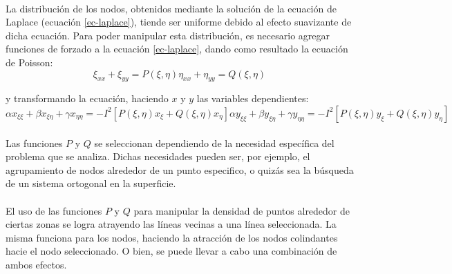 \documentclass[letterpaper, openright, 12pt]{book}
\begin{document}
    \paragraph*{}
        La distribución de los nodos, obtenidos mediante la solución de la
        ecuación de Laplace (ecuación \ref{ec-laplace}), tiende ser uniforme
        debido al efecto suavizante de dicha ecuación. Para poder manipular esta
        distribución, es necesario agregar funciones de forzado a la ecuación
        \ref{ec-laplace}, dando como resultado la ecuación de Poisson:
        \begin{subequations}
            \begin{equation}
                \xi_{xx} + \xi_{yy} = P(\xi, \eta)
            \end{equation}
            \begin{equation}
                \eta_{xx} + \eta_{yy} = Q(\xi, \eta)
            \end{equation}
            \label{ec-poisson}
        \end{subequations}

        y transformando la ecuación, haciendo $x$ y $y$ las variables
        dependientes:
        \begin{subequations}
            \begin{equation}
                \alpha x_{\xi \xi} + \beta x_{\xi \eta} + \gamma x_{\eta \eta} = -I^2 [P(\xi, \eta) x_{\xi} + Q(\xi, \eta) x_{\eta}]
            \end{equation}
            \begin{equation}
                \alpha y_{\xi \xi} + \beta y_{\xi \eta} + \gamma y_{\eta \eta} = -I^2 [P(\xi, \eta) y_{\xi} + Q(\xi, \eta) y_{\eta}]
            \end{equation}
            \label{ec-poisson-invertida}
        \end{subequations}

    \paragraph*{}
        Las funciones $P$ y $Q$ se seleccionan dependiendo de la necesidad
        específica del problema que se analiza. Dichas necesidades pueden ser,
        por ejemplo, el agrupamiento de nodos alrededor de un punto especifico,
        o quizás sea la búsqueda de un sistema ortogonal en la superficie.

    \paragraph*{}
        El uso de las funciones $P$ y $Q$ para manipular la densidad de puntos
        alrededor de ciertas zonas se logra atrayendo las líneas vecinas a una
        línea seleccionada. La misma funciona para los nodos, haciendo la
        atracción de los nodos colindantes hacie el nodo seleccionado. O bien,
        se puede llevar a cabo una combinación de ambos efectos.
\end{document}
